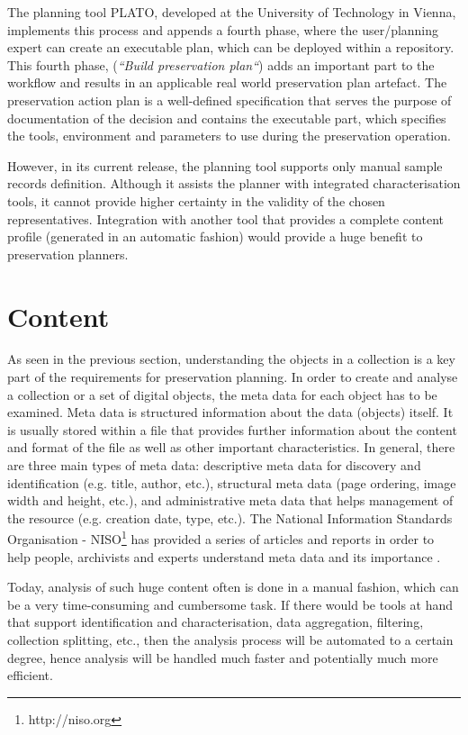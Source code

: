 The planning tool PLATO, developed at the University of Technology in Vienna, implements this process and appends a fourth phase, where the user/planning expert can create an executable plan, which can be deployed within a repository. 
This fourth phase, (\textit{``Build preservation plan``}) adds an important part to the workflow and results in an applicable real world preservation plan artefact. The preservation action plan is a well-defined specification that serves the purpose of documentation of the decision and contains the executable part, which specifies the tools, environment and parameters to use during the preservation operation.

However, in its current release, the planning tool supports only manual sample records definition. Although it assists the planner with integrated characterisation tools, it cannot provide higher certainty in the validity of the chosen representatives. Integration with another tool that provides a complete content profile (generated in an automatic fashion) would provide a huge benefit to preservation planners.

\section{Content}
As seen in the previous section, understanding the objects in a collection is a key part of the requirements for preservation planning. In order to create and analyse a collection or a set of digital objects, the meta data for each object has to be examined. Meta data is structured information about the data (objects) itself. It is usually stored within a file that provides further information about the content and format of the file as well as other important characteristics. In general, there are three main types of meta data: descriptive meta data for discovery and identification (e.g. title, author, etc.), structural meta data (page ordering, image width and height, etc.), and administrative meta data that helps management of the resource (e.g. creation date, type, etc.). The National Information Standards Organisation - NISO\footnote{http://niso.org} has provided a series of articles and reports in order to help people, archivists and experts understand meta data and its importance \cite{citeulike:6387279}.

Today, analysis of such huge content often is done in a manual fashion, which can be a very time-consuming and cumbersome task. If there would be tools at hand that support identification and characterisation, data aggregation, filtering, collection splitting, etc., then the analysis process will be automated to a certain degree, hence analysis will be handled much faster and potentially much more efficient. 

